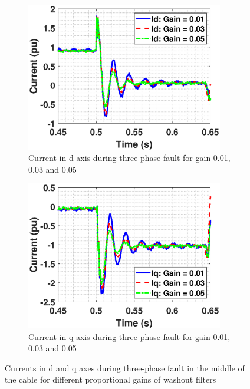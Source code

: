 \begin{figure}[H]
\begin{subfigure}{0.5\textwidth}
  \includegraphics[height = 6.5cm,width = \textwidth]{Diagrams/Chapter_3/ID_Washout_Comp_4.eps}
  \caption{Current in d axis during three phase fault for gain 0.01, 0.03 and 0.05}
  \label{fig:ID_Washout_Comp}
\end{subfigure}%
\begin{subfigure}{0.5\textwidth}
  \includegraphics[height = 6.5cm,width = \textwidth]{Diagrams/Chapter_3/IQ_Washout_Comp_4.eps}
  \caption{Current in q axis during three phase fault for gain 0.01, 0.03 and 0.05}
  \label{fig:IQ_Washout_Comp}
\end{subfigure}
\caption{Currents in d and q axes during three-phase fault in the middle of the cable for different proportional gains of washout filters}
\label{fig:ID_IQ_Washout_Comp}
\end{figure}

